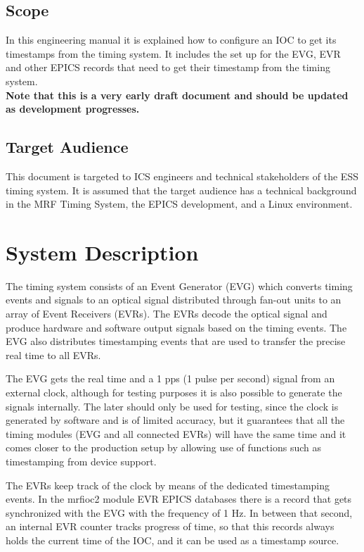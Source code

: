 \documentclass[11pt
  , a4paper
  , article
  , oneside
  , showtrims
]{memoir}
\begin{document}
\section{Scope}
In this engineering manual it is explained how to configure an IOC to get its timestamps from the timing system. It includes the set up for the EVG, EVR and other EPICS records that need to get their timestamp from the timing system.\\

\textbf{Note that this is a very early draft document and should be updated as development progresses.}

\section{Target Audience}
This document is targeted to ICS engineers and technical stakeholders of the ESS timing system. It is assumed that the target audience has a technical background in the MRF Timing System, the EPICS development, and a Linux environment.


\chapter{System Description}
The timing system consists of an Event Generator (EVG) which converts timing events and signals to an optical signal distributed through fan-out units to an array of Event Receivers (EVRs). The EVRs decode the optical signal and produce hardware and software output signals based on the timing events. The EVG also distributes timestamping events that are used to transfer the precise real time to all EVRs.

The EVG gets the real time and a 1 pps (1 pulse per second) signal from an external clock, although for testing purposes it is also possible to generate the signals internally. The later should only be used for testing, since the clock is generated by software and is of limited accuracy, but it guarantees that all the timing modules (EVG and all connected EVRs) will have the same time and it comes closer to the production setup by allowing use of functions such as timestamping from device support.

The EVRs keep track of the clock by means of the dedicated timestamping events. In the mrfioc2 module EVR EPICS databases there is a record that gets synchronized with the EVG with the frequency of 1 Hz. In between that second, an internal EVR counter tracks progress of time, so that this records always holds the current time of the IOC, and it can be used as a timestamp source.
\end{document}
